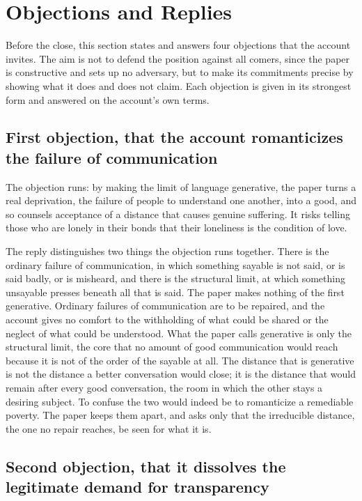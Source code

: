 \section{Objections and Replies}
\label{p26:sec:objections}

\noindent
Before the close, this section states and answers four objections that the account invites. The aim is not to defend the position against all comers, since the paper is constructive and sets up no adversary, but to make its commitments precise by showing what it does and does not claim. Each objection is given in its strongest form and answered on the account's own terms.

\subsection*{First objection, that the account romanticizes the failure of communication}

The objection runs: by making the limit of language generative, the paper turns a real deprivation, the failure of people to understand one another, into a good, and so counsels acceptance of a distance that causes genuine suffering. It risks telling those who are lonely in their bonds that their loneliness is the condition of love.

The reply distinguishes two things the objection runs together. There is the ordinary failure of communication, in which something sayable is not said, or is said badly, or is misheard, and there is the structural limit, at which something unsayable presses beneath all that is said. The paper makes nothing of the first generative. Ordinary failures of communication are to be repaired, and the account gives no comfort to the withholding of what could be shared or the neglect of what could be understood. What the paper calls generative is only the structural limit, the core that no amount of good communication would reach because it is not of the order of the sayable at all. The distance that is generative is not the distance a better conversation would close; it is the distance that would remain after every good conversation, the room in which the other stays a desiring subject. To confuse the two would indeed be to romanticize a remediable poverty. The paper keeps them apart, and asks only that the irreducible distance, the one no repair reaches, be seen for what it is.

\subsection*{Second objection, that it dissolves the legitimate demand for transparency}


